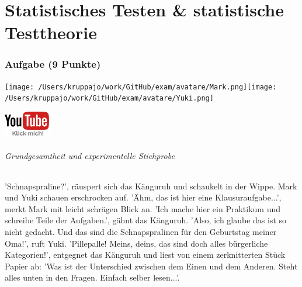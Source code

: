 \documentclass[a4paper, 9pt]{scrartcl}\usepackage[]{graphicx}\usepackage[]{xcolor}
\begin{document}
\part{Statistisches Testen \& statistische Testtheorie}

\section{Aufgabe \hfill (9 Punkte)}


 
\begin{minipage}[t]{0.5\textwidth}
\texttt{[image: /Users/kruppajo/work/GitHub/exam/avatare/Mark.png]}\hspace{-4mm}\texttt{[image: /Users/kruppajo/work/GitHub/exam/avatare/Yuki.png]}
\end{minipage}
\begin{minipage}[t]{0.5\textwidth}
\hfill
\href{https://youtu.be/aHVYuFKTqZs}{\includegraphics[width = 2cm]{img/youtube}}
\end{minipage}



\paragraph{Grundgesamtheit und experimentelle Stichprobe}

'Schnapspraline?', räuspert sich das Känguruh und schaukelt in der Wippe. Mark und Yuki schauen erschrocken auf. 'Ähm, das ist hier eine Klausuraufgabe...', merkt Mark mit leicht schrägen Blick an. 'Ich mache hier ein Praktikum und schreibe Teile der Aufgaben.', gähnt das Känguruh. 'Also, ich glaube das ist so nicht gedacht. Und das sind die Schnapspralinen für den Geburtstag meiner Oma!', ruft Yuki. 'Pillepalle! Meins, deins, das sind doch alles bürgerliche Kategorien!', entgegnet das Känguruh und liest von einem zerknitterten Stück Papier ab: 'Was ist der Unterschied zwischen dem Einen und dem Anderen. Steht alles unten in den Fragen. Einfach selber lesen...'.

\vspace{1ex}
\end{document}
